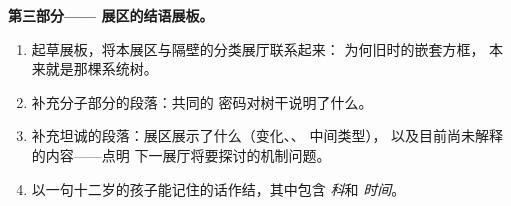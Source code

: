 \begin{problem}
\medskip\noindent\textbf{第三部分——
展区的结语展板。}
\begin{enumerate}[resume]
  \item 起草展板，将本展区与隔壁的分类展厅联系起来：
        为何旧时的嵌套方框，
        本来就是那棵系统树。
  \item 补充分子部分的段落：共同的
        密码对树干说明了什么。
  \item 补充坦诚的段落：展区展示了什么（变化、、
        中间类型），
        以及目前尚未解释的内容——点明
        下一展厅将要探讨的机制问题。
  \item 以一句十二岁的孩子能记住的话作结，其中包含
        \emph{科}和
        \emph{时间}。
\end{enumerate}
\end{problem}
